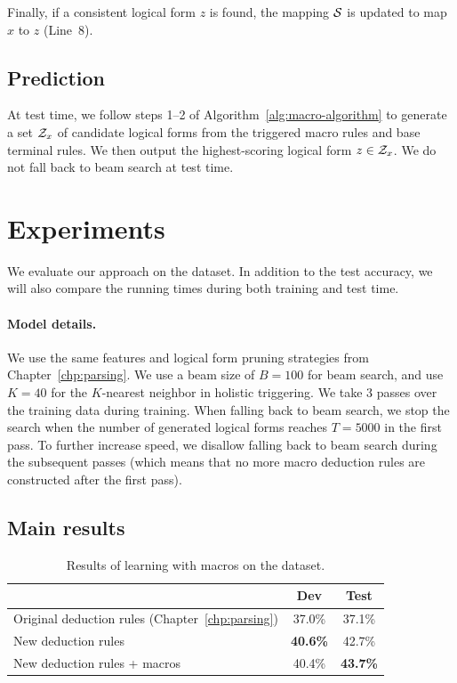 Finally, if a consistent logical form $z$ is found,
the mapping $\mathcal{S}$ is updated to map $x$ to $z$
(Line~8).

\subsection{Prediction}
At test time,
we follow steps 1--2
of Algorithm~\ref{alg:macro-algorithm}
to generate a set $\mathcal{Z}_x$ of candidate logical forms
from the triggered macro rules
and base terminal rules.
We then output the highest-scoring logical form $z \in \mathcal{Z}_x$.
We do not fall back to beam search at test time.

\section{Experiments}

We evaluate our approach on the \wtq dataset.
In addition to the test accuracy,
we will also compare the running times
during both training and test time.

\paragraph{Model details.}
We use the same features and logical form pruning strategies
from Chapter~\ref{chp:parsing}.
We use a beam size of $B = 100$ for beam search,
and use $K = 40$ for the $K$-nearest neighbor
in holistic triggering.
We take 3 passes over the training data during training.
When falling back to beam search,
we stop the search when the number of generated logical forms
reaches $T = 5000$ in the first pass.
To further increase speed,
we disallow falling back to beam search
during the subsequent passes
(which means that no more macro deduction rules
are constructed after the first pass).

\subsection{Main results}

\begin{table}[t]\centering
\begin{tabular}{lcc}\toprule
& \textbf{Dev} & \textbf{Test} \\ \midrule
Original deduction rules (Chapter~\ref{chp:parsing}) & 37.0\%	&37.1\%\\
New deduction rules	& \textbf{40.6\%}	&42.7\%\\
New deduction rules + macros & 40.4\%	& \textbf{43.7\%} \\
\bottomrule
\end{tabular}
\caption{Results of learning with macros on the \wtq dataset.
}\label{tab:macro-accuracy}
\end{table}

